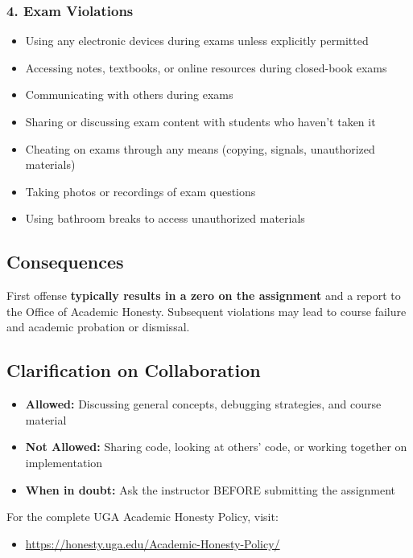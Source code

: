 \documentclass[11pt,letterpaper]{article}
\begin{document}
\subsubsection*{4. Exam Violations}
\begin{itemize}[leftmargin=1cm]
    \item Using any electronic devices during exams unless explicitly permitted
    \item Accessing notes, textbooks, or online resources during closed-book exams
    \item Communicating with others during exams
    \item Sharing or discussing exam content with students who haven't taken it
    \item Cheating on exams through any means (copying, signals, unauthorized materials)
    \item Taking photos or recordings of exam questions
    \item Using bathroom breaks to access unauthorized materials
\end{itemize}

\subsection*{Consequences}

First offense {\bf typically results in a zero on the assignment} and a report to the Office of Academic Honesty. Subsequent violations may lead to course failure and academic probation or dismissal.

\subsection*{Clarification on Collaboration}

\begin{itemize}[leftmargin=1cm]
    \item \textbf{Allowed:} Discussing general concepts, debugging strategies, and course material
    \item \textbf{Not Allowed:} Sharing code, looking at others' code, or working together on implementation
    \item \textbf{When in doubt:} Ask the instructor BEFORE submitting the assignment
\end{itemize}

\noindent
For the complete UGA Academic Honesty Policy, visit: 
\begin{itemize}[leftmargin=1cm]
    \item \url{https://honesty.uga.edu/Academic-Honesty-Policy/}
\end{itemize}
\end{document}
